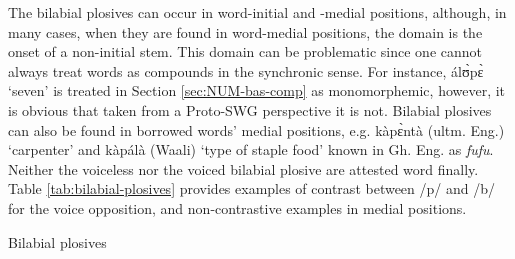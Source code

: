 The bilabial plosives can occur in word-initial and -medial positions, although, 
in many  cases, when they are found in  word-medial positions, the domain  is 
the onset of a non-initial stem. This domain can be problematic since one cannot 
always treat words as compounds in the synchronic sense. For instance, {\sls 
álʊ̀pɛ̀} `seven' is treated in Section \ref{sec:NUM-bas-comp} as   
monomorphemic, however,  it is obvious that taken from a Proto-SWG perspective 
it is not. Bilabial plosives  can also be  found in borrowed words' medial 
positions, e.g. {\sls kàpɛ̀ntà} (ultm. Eng.) `carpenter' and {\sls kàpálà} 
(Waali) `type of staple food'  known in Gh. Eng. as {\it fufu}.  Neither the 
voiceless nor the voiced bilabial plosive are attested word finally. Table 
\ref{tab:bilabial-plosives} provides examples of contrast between /{\sls p}/ 
and 
/{\sls b}/ for the {\sc voice} opposition, and non-contrastive examples  in 
medial positions.


\begin{table}[thb] \small
\small
\centering
\caption{Bilabial plosives \label{tab:bilabial-plosives}}


\quad
{}

\end{table}



